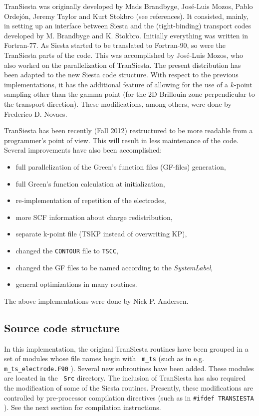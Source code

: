 \documentclass[11pt]{article}
\begin{document}
{\sc TranSiesta} was originally developed by Mads Brandbyge,
Jos\'e-Luis Mozos, Pablo Ordej\'on, Jeremy Taylor and Kurt Stokbro
(see references). It consisted, mainly, in setting up an interface
between {\sc Siesta} and the (tight-binding) transport codes developed
by M. Brandbyge and K. Stokbro. Initially everything was written in
Fortran-77. As {\sc Siesta} started to be translated to Fortran-90, so
were the {\sc TranSiesta} parts of the code. This was accomplished by
Jos\'e-Luis Mozos, who also worked on the parallelization of {\sc
  TranSiesta}.  The present distribution has been adapted to the new
{\sc Siesta} code structure. With respect to the previous
implementations, it has the additional feature of allowing for the use
of a $k$-point sampling other than the gamma point (for the 2D
Brillouin zone perpendicular to the transport direction).  These
modifications, among others, were done by Frederico D. Novaes.

{\sc TranSiesta} has been recently (Fall 2012) restructured to be
more readable from a programmer's point of view. This will result in 
less maintenance of the code. Several improvements have also been 
accomplished:
\begin{itemize}
  \item full parallelization of the Green's function files (GF-files) 
  generation,
  \item full Green's function calculation at initialization,
  \item re-implementation of repetition of the electrodes,
  \item more SCF information about charge redistribution,
  \item separate k-point file (TSKP instead of overwriting KP),
  \item changed the \texttt{CONTOUR} file to \texttt{TSCC},
  \item changed the GF files to be named according to the 
  {\it SystemLabel},
  \item general optimizations in many routines.
\end{itemize}

The above implementations were done by Nick P. Andersen.


\subsection{Source code structure}

In this implementation, the original {\sc TranSiesta} routines have
been grouped in a set of modules whose file names begin with {\tt
  m\_ts} (such as in e.g. {\tt m\_ts\_electrode.F90} ).  Several new
subroutines have been added.  These modules are located in the {\tt
  Src} directory.  The inclusion of {\sc TranSiesta} has also required
the modification of some of the {\sc Siesta} routines. Presently,
these modifications are controlled by pre-processor compilation
directives (such as in {\tt \#ifdef TRANSIESTA} ). See the next
section for compilation instructions.
\end{document}

